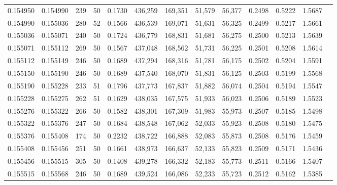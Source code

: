 \begin{tabular}{rrrrrrrrrrrrr}
0.154950 & 0.154990 &   239 &  50 &                                     0.1730 & 436,259 & 169,351 &  51,579 &  56,377 & 0.2498 & 0.5222 & 1.5687 \\
0.154990 & 0.155036 &   280 &  52 &                                     0.1566 & 436,539 & 169,071 &  51,631 &  56,325 & 0.2499 & 0.5217 & 1.5661 \\
0.155036 & 0.155071 &   240 &  50 &                                     0.1724 & 436,779 & 168,831 &  51,681 &  56,275 & 0.2500 & 0.5213 & 1.5639 \\
0.155071 & 0.155112 &   269 &  50 &                                     0.1567 & 437,048 & 168,562 &  51,731 &  56,225 & 0.2501 & 0.5208 & 1.5614 \\
0.155112 & 0.155149 &   246 &  50 &                                     0.1689 & 437,294 & 168,316 &  51,781 &  56,175 & 0.2502 & 0.5204 & 1.5591 \\
0.155150 & 0.155190 &   246 &  50 &                                     0.1689 & 437,540 & 168,070 &  51,831 &  56,125 & 0.2503 & 0.5199 & 1.5568 \\
0.155190 & 0.155228 &   233 &  51 &                                     0.1796 & 437,773 & 167,837 &  51,882 &  56,074 & 0.2504 & 0.5194 & 1.5547 \\
0.155228 & 0.155275 &   262 &  51 &                                     0.1629 & 438,035 & 167,575 &  51,933 &  56,023 & 0.2506 & 0.5189 & 1.5523 \\
0.155276 & 0.155322 &   266 &  50 &                                     0.1582 & 438,301 & 167,309 &  51,983 &  55,973 & 0.2507 & 0.5185 & 1.5498 \\
0.155322 & 0.155376 &   247 &  50 &                                     0.1684 & 438,548 & 167,062 &  52,033 &  55,923 & 0.2508 & 0.5180 & 1.5475 \\
0.155376 & 0.155408 &   174 &  50 &                                     0.2232 & 438,722 & 166,888 &  52,083 &  55,873 & 0.2508 & 0.5176 & 1.5459 \\
0.155408 & 0.155456 &   251 &  50 &                                     0.1661 & 438,973 & 166,637 &  52,133 &  55,823 & 0.2509 & 0.5171 & 1.5436 \\
0.155456 & 0.155515 &   305 &  50 &                                     0.1408 & 439,278 & 166,332 &  52,183 &  55,773 & 0.2511 & 0.5166 & 1.5407 \\
0.155515 & 0.155568 &   246 &  50 &                                     0.1689 & 439,524 & 166,086 &  52,233 &  55,723 & 0.2512 & 0.5162 & 1.5385 \\

\end{tabular}
